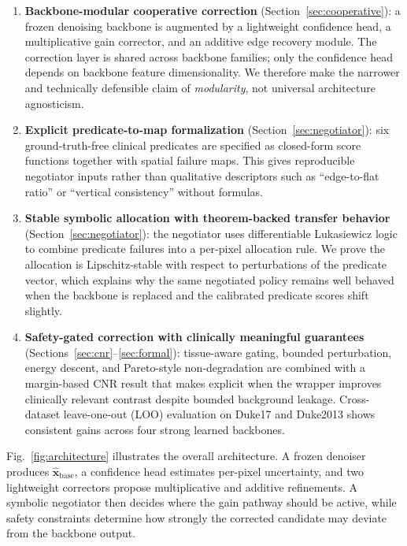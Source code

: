 \documentclass{ieeetj}
\begin{document}
\begin{enumerate}
\item \textbf{Backbone-modular cooperative correction} (Section~\ref{sec:cooperative}): a frozen denoising backbone is augmented by a lightweight confidence head, a multiplicative gain corrector, and an additive edge recovery module. The correction layer is shared across backbone families; only the confidence head depends on backbone feature dimensionality. We therefore make the narrower and technically defensible claim of \emph{modularity}, not universal architecture agnosticism.

\item \textbf{Explicit predicate-to-map formalization} (Section~\ref{sec:negotiator}): six ground-truth-free clinical predicates are specified as closed-form score functions together with spatial failure maps. This gives reproducible negotiator inputs rather than qualitative descriptors such as ``edge-to-flat ratio'' or ``vertical consistency'' without formulas.

\item \textbf{Stable symbolic allocation with theorem-backed transfer behavior} (Section~\ref{sec:negotiator}): the negotiator uses differentiable Lukasiewicz logic~\cite{vankrieken2022analyzing} to combine predicate failures into a per-pixel allocation rule. We prove the allocation is Lipschitz-stable with respect to perturbations of the predicate vector, which explains why the same negotiated policy remains well behaved when the backbone is replaced and the calibrated predicate scores shift slightly.

\item \textbf{Safety-gated correction with clinically meaningful guarantees} (Sections~\ref{sec:cnr}--\ref{sec:formal}): tissue-aware gating, bounded perturbation, energy descent, and Pareto-style non-degradation are combined with a margin-based CNR result that makes explicit when the wrapper improves clinically relevant contrast despite bounded background leakage. Cross-dataset leave-one-out (LOO) evaluation on Duke17 and Duke2013 shows consistent gains across four strong learned backbones.
\end{enumerate}

Fig.~\ref{fig:architecture} illustrates the overall architecture. A frozen denoiser produces $\hat{\mathbf{x}}_\text{base}$, a confidence head estimates per-pixel uncertainty, and two lightweight correctors propose multiplicative and additive refinements. A symbolic negotiator then decides where the gain pathway should be active, while safety constraints determine how strongly the corrected candidate may deviate from the backbone output.
\end{document}
